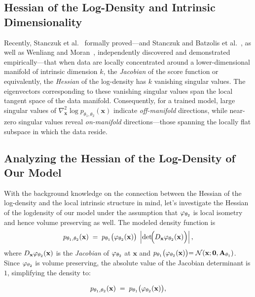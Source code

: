 \subsection{Hessian of the Log-Density and Intrinsic Dimensionality}
Recently, Stanczuk et al.~\cite{pmlr-v235-stanczuk24a} formally proved—and Stanczuk and Batzolis et al.~\cite{pmlr-v235-stanczuk24a}, as well as Wenliang and Moran~\cite{wenliang2022score}, independently discovered and demonstrated empirically—that when data are locally concentrated around a lower-dimensional manifold of intrinsic dimension \(k\), the \textit{Jacobian} of the score function or equivalently, the \textit{Hessian} of the log-density has \(k\) vanishing singular values. The eigenvectors corresponding to these vanishing singular values span the local tangent space of the data manifold. Consequently, for a trained model, large singular values of \(\nabla_{\mathbf{x}}^2\!\log p_{\theta_1, \theta_2}(\mathbf{x})\) indicate \emph{off-manifold} directions, while near-zero singular values reveal \emph{on-manifold} directions—those spanning the locally flat subspace in which the data reside.

\subsection{Analyzing the Hessian of the Log-Density of Our Model}
With the background knowledge on the connection between the Hessian of the log-density and the local intrinsic structure in mind, let's investigate the Hessian of the logdensity of our model under the assumption that $\varphi_{\theta_2}$ is local isometry and hence volume preserving as well. The modeled density function is
\begin{equation}
\label{eq:app_flow_density}
    p_{\theta_1, \theta_2}(\mathbf{x})
    \;=\;
    p_{\theta_1}\bigl(\varphi_{\theta_2}(\mathbf{x})\bigr)
    \;\left|\det\!\Bigl(D_{\mathbf{x}}\varphi_{\theta_2}(\mathbf{x})\Bigr)\right|,
\end{equation}
where 
\(
    D_{\mathbf{x}}\varphi_{\theta_2}(\mathbf{x})
\)
is the \emph{Jacobian} of \(\varphi_{\theta_2}\) at \(\mathbf{x}\) and $p_{\theta_1}\bigl(\varphi_{\theta_2}(\mathbf{x})\bigl)=\mathcal{N}(\mathbf{x};\mathbf{0},\mathbf{A}_{\theta_1})$. Since $\varphi_{\theta_2}$ is volume preserving, the absolute value of the Jacobian determinant is $1$, simplifying the density to:

\begin{equation}
    \label{eq:simplified_app_flow_density}
        p_{\theta_1, \theta_2}(\mathbf{x})
        \;=\;
        p_{\theta_1}\bigl(\varphi_{\theta_2}(\mathbf{x})\bigr),
    \end{equation}

